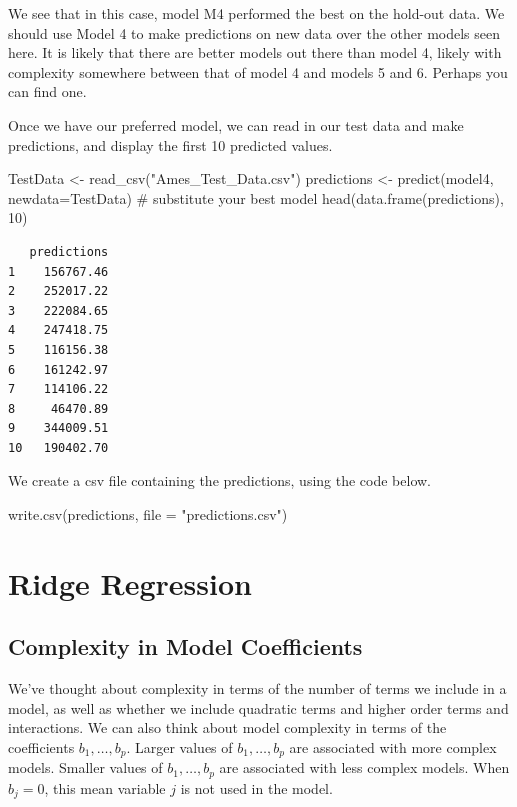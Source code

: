 \documentclass[
  letterpaper,
  DIV=11,
  numbers=noendperiod]{scrreprt}
\newenvironment{Shaded}{\begin{snugshade}}{\end{snugshade}}
\newcommand{\AttributeTok}[1]{\textcolor[rgb]{0.40,0.45,0.13}{#1}}
\newcommand{\CommentTok}[1]{\textcolor[rgb]{0.37,0.37,0.37}{#1}}
\newcommand{\DecValTok}[1]{\textcolor[rgb]{0.68,0.00,0.00}{#1}}
\newcommand{\FunctionTok}[1]{\textcolor[rgb]{0.28,0.35,0.67}{#1}}
\newcommand{\NormalTok}[1]{\textcolor[rgb]{0.00,0.23,0.31}{#1}}
\newcommand{\OtherTok}[1]{\textcolor[rgb]{0.00,0.23,0.31}{#1}}
\newcommand{\StringTok}[1]{\textcolor[rgb]{0.13,0.47,0.30}{#1}}
\begin{document}
We see that in this case, model M4 performed the best on the hold-out
data. We should use Model 4 to make predictions on new data over the
other models seen here. It is likely that there are better models out
there than model 4, likely with complexity somewhere between that of
model 4 and models 5 and 6. Perhaps you can find one.

Once we have our preferred model, we can read in our test data and make
predictions, and display the first 10 predicted values.

\begin{Shaded}
\begin{Highlighting}[]
\NormalTok{TestData }\OtherTok{\textless{}{-}} \FunctionTok{read\_csv}\NormalTok{(}\StringTok{"Ames\_Test\_Data.csv"}\NormalTok{)}
\NormalTok{predictions }\OtherTok{\textless{}{-}} \FunctionTok{predict}\NormalTok{(model4, }\AttributeTok{newdata=}\NormalTok{TestData)  }\CommentTok{\# substitute your best model}
\FunctionTok{head}\NormalTok{(}\FunctionTok{data.frame}\NormalTok{(predictions), }\DecValTok{10}\NormalTok{)}
\end{Highlighting}
\end{Shaded}

\begin{verbatim}
   predictions
1    156767.46
2    252017.22
3    222084.65
4    247418.75
5    116156.38
6    161242.97
7    114106.22
8     46470.89
9    344009.51
10   190402.70
\end{verbatim}

We create a csv file containing the predictions, using the code below.

\begin{Shaded}
\begin{Highlighting}[]
\FunctionTok{write.csv}\NormalTok{(predictions, }\AttributeTok{file =} \StringTok{"predictions.csv"}\NormalTok{)}
\end{Highlighting}
\end{Shaded}

\section{Ridge Regression}\label{ridge-regression}

\subsection{Complexity in Model
Coefficients}\label{complexity-in-model-coefficients}

We've thought about complexity in terms of the number of terms we
include in a model, as well as whether we include quadratic terms and
higher order terms and interactions. We can also think about model
complexity in terms of the coefficients \(b_1, \ldots, b_p\). Larger
values of \(b_1, \ldots, b_p\) are associated with more complex models.
Smaller values of \(b_1, \ldots, b_p\) are associated with less complex
models. When \(b_j=0\), this mean variable \(j\) is not used in the
model.
\end{document}
